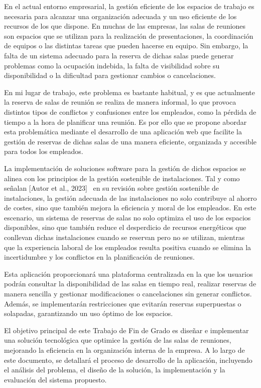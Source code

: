 
En el actual entorno empresarial, la gestión eficiente de los espacios de trabajo es necesaria para alcanzar una organización adecuada y un uso eficiente de los recursos de los que dispone. En muchas de las empresas, las salas de reuniones son espacios que se utilizan para la realización de presentaciones, la coordinación de equipos o las distintas tareas que pueden hacerse en equipo. Sin embargo, la falta de un sistema adecuado para la reserva de dichas salas puede generar problemas como la ocupación indebida, la falta de visibilidad sobre su disponibilidad o la dificultad para gestionar cambios o cancelaciones.

En mi lugar de trabajo, este problema es bastante habitual, y es que actualmente la reserva de salas de reunión se realiza de manera informal, lo que provoca distintos tipos de conflictos y confusiones entre los empleados, como la pérdida de tiempo a la hora de planificar una reunión. Es por ello que se propone abordar esta problemática mediante el desarrollo de una aplicación web que facilite la gestión de reservas de dichas salas de una manera eficiente, organizada y accesible para todos los empleados.

La implementación de soluciones software para la gestión de dichos espacios se alinea con los principios de la gestión sostenible de instalaciones. Tal y como señalan [Autor et al., 2023]~\cite{su15043174} en su revisión sobre gestión sostenible de instalaciones, la gestión adecuada de las instalaciones no solo contribuye al ahorro de costes, sino que también mejora la eficiencia y moral de los empleados. En este escenario, un sistema de reservas de salas no solo optimiza el uso de los espacios disponibles, sino que también reduce el desperdicio de recursos energéticos que conllevan dichas instalaciones cuando se reservan pero no se utilizan, mientras que la experiencia laboral de los empleados resulta positiva cuando se elimina la incertidumbre y los conflictos en la planificación de reuniones.

Esta aplicación proporcionará una plataforma centralizada en la que los usuarios podrán consultar la disponibilidad de las salas en tiempo real, realizar reservas de manera sencilla y gestionar modificaciones o cancelaciones sin generar conflictos. Además, se implementarán restricciones que evitarán reservas superpuestas o solapadas, garantizando un uso óptimo de los espacios.

El objetivo principal de este Trabajo de Fin de Grado es diseñar e implementar una solución tecnológica que optimice la gestión de las salas de reuniones, mejorando la eficiencia en la organización interna de la empresa. A lo largo de este documento, se detallará el proceso de desarrollo de la aplicación, incluyendo el análisis del problema, el diseño de la solución, la implementación y la evaluación del sistema propuesto.


